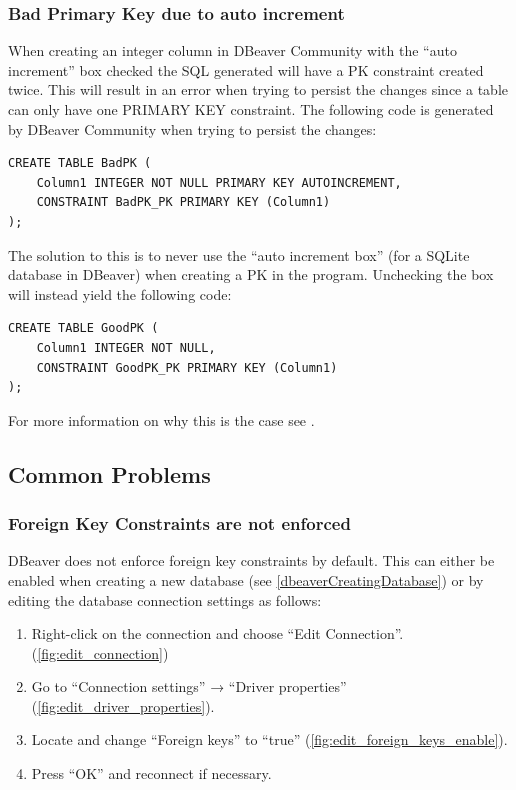 \documentclass[a4paper,11pt,oneside]{article}
\begin{document}
\begin{sloppypar}
\subsubsection{Bad Primary Key due to auto increment}
When creating an integer column in DBeaver Community with the ``auto increment'' box checked the SQL generated will have a PK constraint created twice. This will result in an error when trying to persist the changes since a table can only have one PRIMARY KEY constraint. The following code is generated by DBeaver Community when trying to persist the changes:
\begin{lstlisting}[caption={Bad Primary Key due to auto increment in DBeaver}]
CREATE TABLE BadPK (
	Column1 INTEGER NOT NULL PRIMARY KEY AUTOINCREMENT,
	CONSTRAINT BadPK_PK PRIMARY KEY (Column1)
);
\end{lstlisting}
The solution to this is to never use the ``auto increment box'' (for a SQLite database in DBeaver) when creating a PK in the program. Unchecking the box will instead yield the following code:
\begin{lstlisting}[caption={Ok Primary Key in DBeaver if auto increment is unchecked}]
CREATE TABLE GoodPK (
	Column1 INTEGER NOT NULL,
	CONSTRAINT GoodPK_PK PRIMARY KEY (Column1)
);
\end{lstlisting}
For more information on why this is the case see \cite{dbeaver_issue_18491}.


\subsection{Common Problems}
\label{dbeaverCommonProblems}

\subsubsection{Foreign Key Constraints are not enforced}
\label{dbeaverForeignKeysNotEnforced}
DBeaver does not enforce foreign key constraints by default. This can either be enabled when creating a new database (see \autoref{dbeaverCreatingDatabase}) or by editing the database connection settings as follows:
\begin{enumerate}
    \item Right-click on the connection and choose ``Edit Connection''. (\autoref{fig:edit_connection})
    \item Go to ``Connection settings'' → ``Driver properties'' (\autoref{fig:edit_driver_properties}).
    \item Locate and change ``Foreign keys'' to ``true'' (\autoref{fig:edit_foreign_keys_enable}).
    \item Press ``OK'' and reconnect if necessary.
\end{enumerate}


\end{sloppypar}
\end{document}
